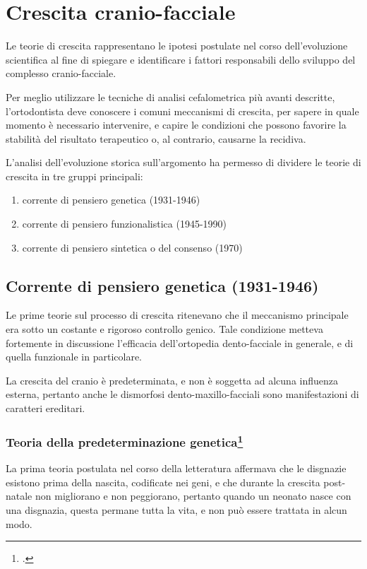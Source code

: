 \chapter{Crescita cranio-facciale}
\nocite{Enlow1986,Cozza2006}

Le teorie di crescita rappresentano le ipotesi postulate nel corso dell'evoluzione scientifica al fine di spiegare e identificare i fattori responsabili dello sviluppo del complesso cranio-facciale.

Per meglio utilizzare le tecniche di analisi cefalometrica più avanti descritte, l'or\-to\-don\-ti\-sta deve conoscere i comuni meccanismi di crescita, per sapere in quale momento è necessario intervenire, e capire le condizioni che possono favorire la stabilità del risultato terapeutico o, al contrario, causarne la recidiva.

L'analisi dell'evoluzione storica sull'argomento ha permesso di dividere le teorie di crescita in tre gruppi principali:
\begin{enumerate}
\item corrente di pensiero genetica (1931-1946)
\item corrente di pensiero funzionalistica (1945-1990)
\item corrente di pensiero sintetica o del consenso (1970)
\end{enumerate}

\section{Corrente di pensiero genetica (1931-1946)}
Le prime teorie sul processo di crescita ritenevano che il meccanismo principale era sotto un costante e rigoroso controllo genico. Tale condizione metteva fortemente in discussione l'efficacia dell'ortopedia dento-facciale in generale, e di quella funzionale in particolare.

La crescita del cranio è predeterminata, e non è soggetta ad alcuna influenza esterna, pertanto anche le dismorfosi dento-maxillo-facciali sono manifestazioni di caratteri ereditari.

\subsection*{Teoria della predeterminazione genetica\protect\footcite{Broadbent1931,Broadbent1937,Brodie1941,Brodie1946}}
La prima teoria postulata nel corso della letteratura affermava che le disgnazie esistono prima della nascita, codificate nei geni, e che durante la crescita post-natale non migliorano e non peggiorano, pertanto quando un neonato nasce con una disgnazia, questa permane tutta la vita, e non può essere trattata in alcun modo.

